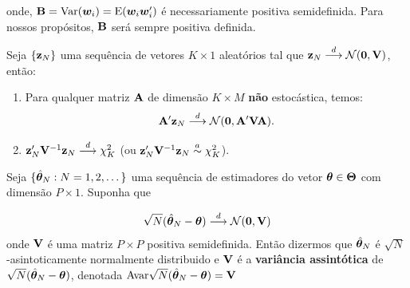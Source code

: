 \documentclass[11pt, oneside, a4paper, article]{article}
\numberwithin{equation}{section}
\begin{document}
\begin{description}
\begin{teo}
	\noindent
	onde, $\mathbf{B} = \text{Var}(\boldsymbol{w}_{i}) = \text{E}( \boldsymbol{w}_{i} \boldsymbol{w}_{i}')$ é necessariamente positiva semidefinida.
	Para nossos propósitos, $\mathbf{B}$ será sempre positiva definida.
\end{teo}

\begin{cor}[]
	\citet[Cor 3.2, p.39]{wool-2010}

	Seja $\{\mathbf{z}_{N}\}$ uma sequência de vetores $K \times 1$ aleatórios tal que
	$\mathbf{z}_{N}  \overset{d}{\longrightarrow}  \mathcal{N}(\boldsymbol{0}, \mathbf{V})$, então:

	\begin{enumerate}
		\item 
			Para qualquer matriz $\mathbf{A}$ de dimensão $K \times M$ \textbf{não} estocástica, temos:
			\begin{align*}
				\mathbf{A}' \mathbf{z}_{N}  \overset{d}{\longrightarrow}  \mathcal{N}(\boldsymbol{0}, \mathbf{A}'\mathbf{V}\mathbf{A}).
			\end{align*}

		\item $\mathbf{z}_{N}'\mathbf{V}^{-1}\mathbf{z}_{N}  \overset{d}{\longrightarrow}  \chi^{2}_{K}$ (ou $\mathbf{z}_{N}'\mathbf{V}^{-1}\mathbf{z}_{N} \overset{a}{\sim} \chi^{2}_{K}$).
	\end{enumerate}


\end{cor}

\begin{defn}
	\citet[Def 3.9, p.40]{wool-2010}

	Seja $\{\hat{\boldsymbol{\theta}}_{N}: N=1,2,\dots\}$ uma sequência de estimadores do vetor $\boldsymbol{\theta} \in \boldsymbol{\Theta}$ com dimensão $P \times 1$.
	Suponha que

	\vspace{-1 em} 
	\begin{align}\label{nroot:conv}
		\sqrt{N}(\hat{\boldsymbol{\theta}}_{N} - \boldsymbol{\theta}) 
		 \overset{d}{\longrightarrow}  
		\mathcal{N}(\boldsymbol{0}, \mathbf{V})
	\end{align}
	onde $\mathbf{V}$ é uma matriz $P \times P$ positiva semidefinida.
	Então dizermos que $\hat{\boldsymbol{\theta}}_{N}$ é $\sqrt{N}$-asintoticamente normalmente distribuido e
	$\mathbf{V}$ é a \textbf{variância assintótica} de 
	$\sqrt{N}(\hat{\boldsymbol{\theta}}_{N} - \boldsymbol{\theta})$,
	denotada $\text{Avar} \sqrt{N}(\hat{\boldsymbol{\theta}}_{N} - \boldsymbol{\theta}) = \mathbf{V}$
\end{defn}


\end{description}
\end{document}
